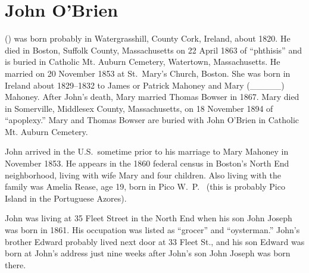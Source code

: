 \section{John O'Brien}\label{per:John2OBrien}

 () was born probably in Watergrasshill, County Cork, Ireland, about 1820.\cite{John2OBrienMarriage:2} He died in Boston, Suffolk County, Massachusetts on 22 April 1863 of ``phthisis'' \cite{John2OBrienDeath:2} and is buried in Catholic Mt. Auburn Cemetery, Watertown, Massachusetts.\cite{BillMcEvoy:1} He married  on 20 November 1853 at St.\ Mary's Church, Boston.\cite{John2OBrienMarriage:3} She was born in Ireland about 1829--1832 to James or Patrick Mahoney and Mary (\_\_\_\_\_) Mahoney.\cite{John2OBrienCivilMarriage:2} After John's death, Mary married Thomas Bowser in 1867.\cite{MaryMahoneyBowserMarriage:2} Mary died in Somerville, Middlesex County, Massachusetts, on 18 November 1894 of ``apoplexy.''\cite{MaryMahoneyDeath} Mary and Thomas Bowser are buried with John O'Brien in Catholic Mt. Auburn Cemetery.\cite{BillMcEvoy:2}

John arrived in the U.S.\ sometime prior to his marriage to Mary Mahoney in November 1853. He appears in the 1860 federal census in Boston's North End neighborhood, living with wife Mary and four children. Also living with the family was Amelia Rease, age 19, born in Pico W.\ P.\ \cite{Census1860John} (this is probably Pico Island in the Portuguese Azores). 

John was living at 35 Fleet Street in the North End when his son John Joseph was born in 1861. His occupation was listed as ``grocer''\cite{John3OBrienBirth:2} and ``oysterman.''\cite{1861John2OBrien:2} John's brother Edward probably lived next door at 33 Fleet St.,\cite{1861EdwardOBrien} and his son Edward was born at John's address just nine weeks after John's son John Joseph was born there.\cite{John3OBrienBirth:3}

